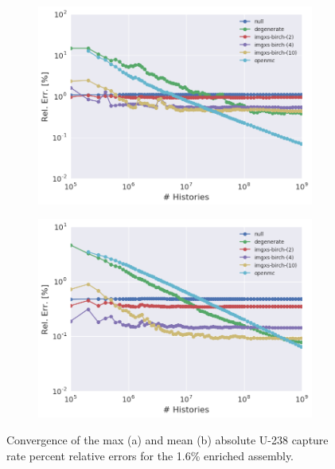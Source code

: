 \begin{figure}[h!]
\centering
\begin{subfigure}{\textwidth}
  \centering
  \includegraphics[width=0.9\linewidth]{figures/results/convergence/assm-16/max-capt-err-evo}
  \caption{}
  \label{fig:chap11-assm-1.6-capture-converge-max}
\end{subfigure}
\begin{subfigure}{\textwidth}
  \centering
  \includegraphics[width=0.9\linewidth]{figures/results/convergence/assm-16/mean-capt-err-evo}
  \caption{}
  \label{fig:chap11-assm-1.6-capture-converge-mean}
\end{subfigure}
\vspace{2mm}
\caption[Fission rate covergence for a 1.6\% enriched assembly]{Convergence of the max (a) and mean (b) absolute U-238 capture rate percent relative errors for the 1.6\% enriched assembly.}
\label{fig:chap11-assm-1.6-capture-converge}
\end{figure}

